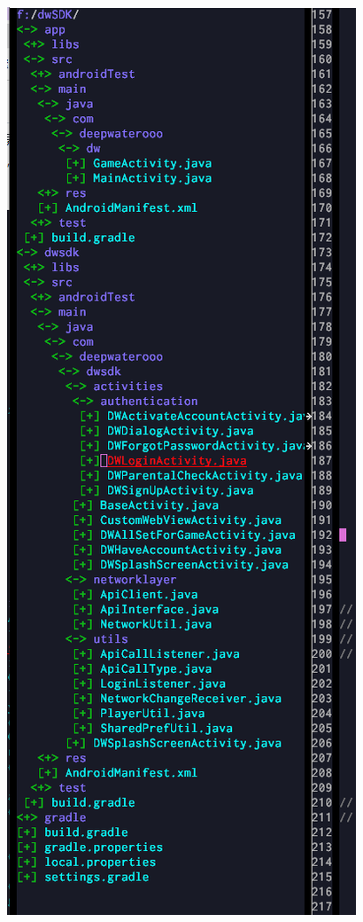 \documentclass[9pt, b5paper]{article}
\begin{document}
\includegraphics[width=.9\linewidth]{./pic/readme_20221125_223527.png}
\end{document}
